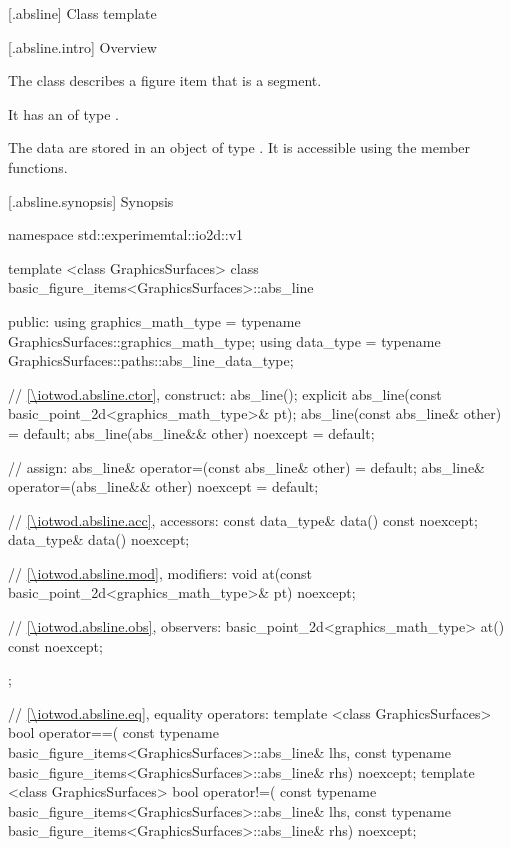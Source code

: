  [\iotwod.absline] {Class template }

 [\iotwod.absline.intro] {Overview}

\pnum
{}%
The class  describes a figure item that is a segment.

\pnum
It has an  of type .

\pnum
The data are stored in an object of type . It is accessible using the  member functions.

 [\iotwod.absline.synopsis] {Synopsis}
\begin{codeblock}
namespace std::experimemtal::io2d::v1 {
  template <class GraphicsSurfaces>
  class basic_figure_items<GraphicsSurfaces>::abs_line {
  public:
    using graphics_math_type = typename GraphicsSurfaces::graphics_math_type;
    using data_type =
      typename GraphicsSurfaces::paths::abs_line_data_type;

    // \ref{\iotwod.absline.ctor}, construct:
    abs_line();
    explicit abs_line(const basic_point_2d<graphics_math_type>& pt);
    abs_line(const abs_line& other) = default;
    abs_line(abs_line&& other) noexcept = default;

    // assign:
    abs_line& operator=(const abs_line& other) = default;
    abs_line& operator=(abs_line&& other) noexcept = default;

    // \ref{\iotwod.absline.acc}, accessors:
    const data_type& data() const noexcept;
    data_type& data() noexcept;

    // \ref{\iotwod.absline.mod}, modifiers:
    void at(const basic_point_2d<graphics_math_type>& pt) noexcept;

    // \ref{\iotwod.absline.obs}, observers:
    basic_point_2d<graphics_math_type> at() const noexcept;
  };
  
  // \ref{\iotwod.absline.eq}, equality operators:
  template <class GraphicsSurfaces>
  bool operator==(
    const typename basic_figure_items<GraphicsSurfaces>::abs_line& lhs,
    const typename basic_figure_items<GraphicsSurfaces>::abs_line& rhs) 
    noexcept;  
  template <class GraphicsSurfaces>
  bool operator!=(
    const typename basic_figure_items<GraphicsSurfaces>::abs_line& lhs,
    const typename basic_figure_items<GraphicsSurfaces>::abs_line& rhs) 
    noexcept;  
}
\end{codeblock}

